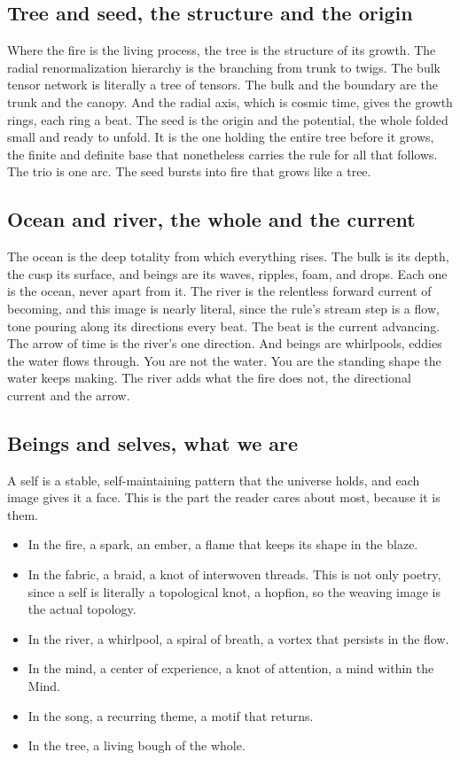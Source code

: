 \subsection{Tree and seed, the structure and the origin}

Where the fire is the living process, the tree is the structure of its growth. The radial renormalization hierarchy is the branching from trunk to twigs. The bulk tensor network is literally a tree of tensors. The bulk and the boundary are the trunk and the canopy. And the radial axis, which is cosmic time, gives the growth rings, each ring a beat. The seed is the origin and the potential, the whole folded small and ready to unfold. It is the one holding the entire tree before it grows, the finite and definite base that nonetheless carries the rule for all that follows. The trio is one arc. The seed bursts into fire that grows like a tree.

\subsection{Ocean and river, the whole and the current}

The ocean is the deep totality from which everything rises. The bulk is its depth, the cusp its surface, and beings are its waves, ripples, foam, and drops. Each one is the ocean, never apart from it. The river is the relentless forward current of becoming, and this image is nearly literal, since the rule's stream step is a flow, tone pouring along its directions every beat. The beat is the current advancing. The arrow of time is the river's one direction. And beings are whirlpools, eddies the water flows through. You are not the water. You are the standing shape the water keeps making. The river adds what the fire does not, the directional current and the arrow.

\subsection{Beings and selves, what we are}

A self is a stable, self-maintaining pattern that the universe holds, and each image gives it a face. This is the part the reader cares about most, because it is them.

\begin{itemize}
  \item In the fire, a spark, an ember, a flame that keeps its shape in the blaze.
  \item In the fabric, a braid, a knot of interwoven threads. This is not only poetry, since a self is literally a topological knot, a hopfion, so the weaving image is the actual topology.
  \item In the river, a whirlpool, a spiral of breath, a vortex that persists in the flow.
  \item In the mind, a center of experience, a knot of attention, a mind within the Mind.
  \item In the song, a recurring theme, a motif that returns.
  \item In the tree, a living bough of the whole.
\end{itemize}

